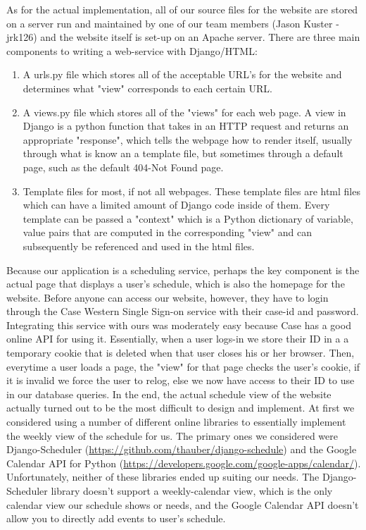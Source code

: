 \documentclass[pdftex,12pt,letter]{article}
\begin{document}
As for the actual implementation, all of our source files for the website are stored on a server run and maintained by one of our team members (Jason Kuster - jrk126) and the website itself is set-up on an Apache server. There are three main components to writing a web-service with Django/HTML:
\begin{enumerate}[1.]
\item A urls.py file which stores all of the acceptable URL's for the website and determines what "view" corresponds to each certain URL.
\item A views.py file which stores all of the "views" for each web page. A view in Django is a python function that takes in an HTTP request and returns an appropriate "response", which tells the webpage how to render itself, usually through what is know an a template file, but sometimes through a default page, such as the default 404-Not Found page.
\item Template files for most, if not all webpages. These template files are html files which can have a limited amount of Django code inside of them. Every template can be passed a "context" which is a Python dictionary of {variable, value} pairs that are computed in the corresponding "view" and can subsequently be referenced and used in the html files.
\end{enumerate}
Because our application is a scheduling service, perhaps the key component is the actual page that displays a user's schedule, which is also the homepage for the website. Before anyone can access our website, however, they have to login through the Case Western Single Sign-on service with their case-id and password. Integrating this service with ours was moderately easy because Case has a good online API for using it. Essentially, when a user logs-in we store their ID in a a temporary cookie that is deleted when that user closes his or her browser. Then, everytime a user loads a page, the "view" for that page checks the user's cookie, if it is invalid we force the user to relog, else we now have access to their ID to use in our database queries. In the end, the actual schedule view of the website actually turned out to be the most difficult to design and implement. At first we considered using a number of different online libraries to essentially implement the weekly view of the schedule for us. The primary ones we considered were Django-Scheduler (\url{https://github.com/thauber/django-schedule}) and the Google Calendar API for Python (\url{https://developers.google.com/google-apps/calendar/}). Unfortunately, neither of these libraries ended up suiting our needs. The Django-Scheduler library doesn't support a weekly-calendar view, which is the only calendar view our schedule shows or needs, and the Google Calendar API doesn't allow you to directly add events to user's schedule.\\
\end{document}
